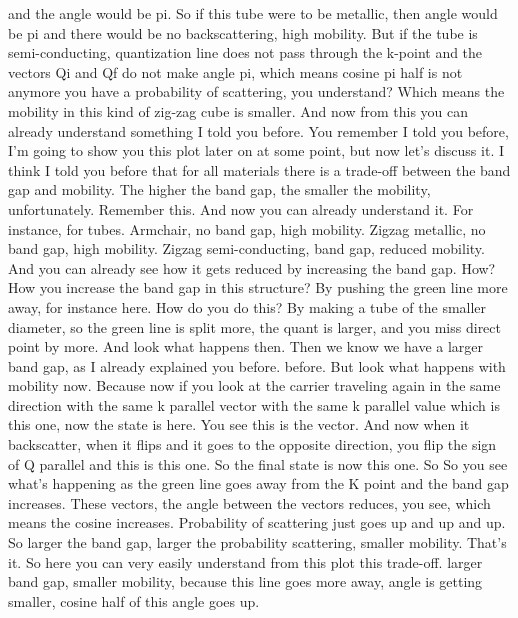 and the angle would be pi. So if this tube were to be metallic, then angle would be pi and there would be no backscattering, high mobility. But if the tube is semi-conducting, quantization line does not pass through the k-point and the vectors Qi and Qf do not make angle pi, which means cosine pi half is not anymore you have a probability of scattering, you understand? Which means the mobility in this kind of zig-zag cube is smaller. And now from this you can already understand something I told you before. You remember I told you before, I'm going to show you this plot later on at some point, but now let's discuss it. I think I told you before that for all materials there is a trade-off between the band gap and mobility. The higher the band gap, the smaller the mobility, unfortunately. Remember this. And now you can already understand it. For instance, for tubes. Armchair, no band gap, high mobility. Zigzag metallic, no band gap, high mobility. Zigzag semi-conducting, band gap, reduced mobility. And you can already see how it gets reduced by increasing the band gap. How? How you increase the band gap in this structure? By pushing the green line more away, for instance here. How do you do this? By making a tube of the smaller diameter, so the green line is split more, the quant is larger, and you miss direct point by more. And look what happens then. Then we know we have a larger band gap, as I already explained you before. before. But look what happens with mobility now. Because now if you look at the carrier traveling again in the same direction with the same k parallel vector with the same k parallel value which is this one, now the state is here. You see this is the vector. And now when it backscatter, when it flips and it goes to the opposite direction, you flip the sign of Q parallel and this is this one. So the final state is now this one. So So you see what's happening as the green line goes away from the K point and the band gap increases. These vectors, the angle between the vectors reduces, you see, which means the cosine increases. Probability of scattering just goes up and up and up. So larger the band gap, larger the probability scattering, smaller mobility. That's it. So here you can very easily understand from this plot this trade-off. larger band gap, smaller mobility, because this line goes more away, angle is getting smaller, cosine half of this angle goes up.
